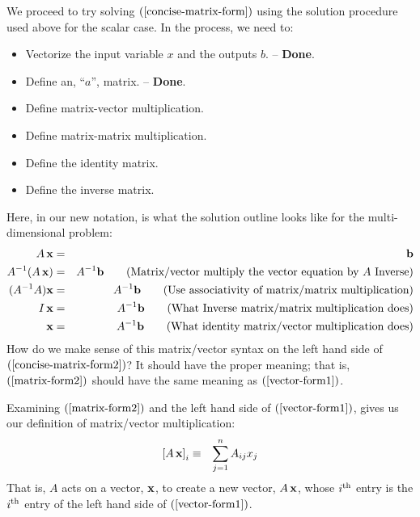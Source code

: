 \documentclass{article}
\begin{document}
We proceed to try solving $(\ref{concise-matrix-form})$ using the solution 
procedure used above for the scalar case. In the process, we need to:
\begin{itemize}
    \item{Vectorize the input variable $x$ and the outputs $b$. -- {\bf Done}.}
    \item{Define an, ``$a$'', matrix. -- {\bf Done}.}
    \item{Define matrix-vector multiplication.}
    \item{Define matrix-matrix multiplication.}
    \item{Define the identity matrix.}
    \item{Define the inverse matrix.}
\end{itemize}
Here, in our new notation, is what the solution outline looks like for the multi-dimensional problem:
\begin{eqnarray}
	A \, {\bf x} & = & {\bf b} \label{concise-matrix-form2}\\
	A^{-1} ( A \, {\bf x} ) & = & A^{-1} {\bf b} \quad \quad \text{(Matrix/vector multiply the vector equation by $A$ Inverse)} \label{inv-vec} \\
	(A^{-1} A) {\bf x} & = & A^{-1} {\bf b} \quad \quad \text{(Use associativity of matrix/matrix multiplication)} \label{assoc-vec} \\
	I \, {\bf x} & = & A^{-1} {\bf b} \quad \quad \text{(What Inverse matrix/matrix multiplication does)} \label{inv-mult-vec} \\
	{\bf x} & = & A^{-1} {\bf b} \quad \quad \text{(What identity matrix/vector multiplication does)} \label{identity-vec}
\end{eqnarray}
How do we make sense of this matrix/vector syntax on the left hand side of 
$(\ref{concise-matrix-form2})$? It should have
the proper meaning; that is, $(\ref{matrix-form2})$
should have the same meaning as $(\ref{vector-form1})$.

Examining $(\ref{matrix-form2})$ and the left hand side of
$(\ref{vector-form1})$, gives us our definition of matrix/vector multiplication:
\begin{eqnarray}
  \left[A \, {\bf x}\right]_i & \equiv & \sum_{j=1}^n A_{ij} x_j
                                         \label{matrix-vector-mult}
\end{eqnarray}
That is, $A$ acts on a vector, ${\bf x}$, to create a new vector, $A \, {\bf x}$,
whose $i^{\rm th}$ entry is the $i^{\rm th}$ entry of
the left hand side of $(\ref{vector-form1})$.
\end{document}
